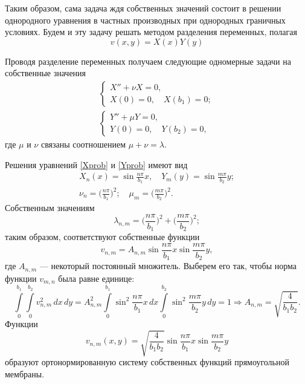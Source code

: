 Таким образом, сама задача ждя собственных значений состоит в решении однородного уравнения в частных производных при однородных граничных условиях. Будем и эту задачу решать методом разделения переменных, полагая 
\begin{equation*}
	v(x, y) = X(x) Y(y)
\end{equation*}

Проводя разделение переменных получаем следующие одномерные задачи на собственные значения 
\begin{align}
	\begin{cases}
		X'' + \nu X = 0, \\
		X(0) = 0, \quad X(b_1) = 0;
	\end{cases} \label{Xprob}\\
	\begin{cases}
		Y'' + \mu Y = 0, \\
		Y(0) = 0, \quad Y(b_2) = 0,
	\end{cases} \label{Yprob}
\end{align}
где $\mu$ и $\nu$ связаны соотношением $\mu + \nu = \lambda$. 

Решения уравнений \eqref{Xprob} и \eqref{Yprob} имеют вид
\begin{gather*}
	X_n(x) = \sin{\frac{n \pi}{b_1} x}, \quad Y_{m}(y) = \sin{\frac{m \pi}{b_2} y}; \\
	\nu_n = \Big(\frac{n \pi}{b_1}\Big)^2; \quad \mu_m = \Big(\frac{m \pi}{b_2}\Big)^2.
\end{gather*}
Собственным значениям 
\begin{equation*}
	\lambda_{n, m} = \Big(\frac{n \pi}{b_1}\Big)^2 + \Big(\frac{m \pi}{b_2}\Big)^2;
\end{equation*}
таким образом, соответствуют собственные функции
\begin{equation*}
	v_{n, m} = A_{n, m} \sin{\frac{n \pi}{b_1} x} \sin{\frac{m \pi}{b_2} y},
\end{equation*}
где $A_{n, m}$ --- некоторый постоянный множитель. Выберем его так, чтобы норма функции $v_{m, n}$ была равне единице:
\begin{equation*}
	\int \limits_{0}^{b_1} \int \limits_{0}^{b_2} v^2_{n, m} \, dx \, dy = A_{n, m}^2 \int \limits_0^{b_1} \sin^2{\frac{n \pi}{b_1}x} \, dx \int \limits_{0}^{b_2} \sin^2{\frac{m \pi}{b_2} y} \, dy = 1 \Rightarrow A_{n, m} = \sqrt{\frac{4}{b_1 b_2}}.
\end{equation*}
Функции
\begin{equation} \label{Vformula}
	v_{n, m}(x, y) = \sqrt{\frac{4}{b_1 b_2}} \sin{\frac{n \pi}{b_1} x} \sin{\frac{m \pi}{b_2} y}
\end{equation}
образуют ортонормированную систему собственных функций прямоугольной мембраны.


